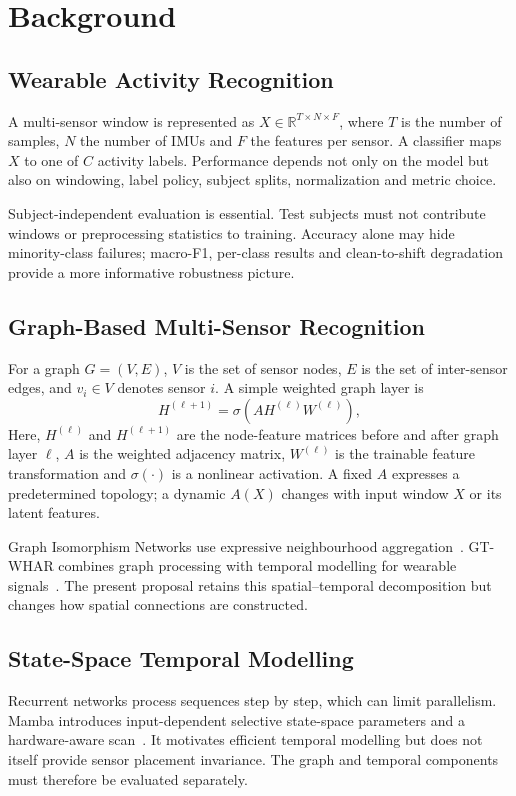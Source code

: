 \documentclass[12pt,a4paper,twoside,openright]{report}
\begin{document}
\section{Background}

\subsection{Wearable Activity Recognition}
A multi-sensor window is represented as $X\in\mathbb{R}^{T\times N\times F}$, where $T$ is the number of samples, $N$ the number of IMUs and $F$ the features per sensor. A classifier maps $X$ to one of $C$ activity labels. Performance depends not only on the model but also on windowing, label policy, subject splits, normalization and metric choice.

Subject-independent evaluation is essential. Test subjects must not contribute windows or preprocessing statistics to training. Accuracy alone may hide minority-class failures; macro-F1, per-class results and clean-to-shift degradation provide a more informative robustness picture.

\subsection{Graph-Based Multi-Sensor Recognition}
For a graph $G=(V,E)$, $V$ is the set of sensor nodes, $E$ is the set of inter-sensor edges, and $v_i\in V$ denotes sensor $i$. A simple weighted graph layer is
\[
H^{(\ell+1)}=\sigma\!\left(AH^{(\ell)}W^{(\ell)}\right),
\]
Here, $H^{(\ell)}$ and $H^{(\ell+1)}$ are the node-feature matrices before and after graph layer $\ell$, $A$ is the weighted adjacency matrix, $W^{(\ell)}$ is the trainable feature transformation and $\sigma(\cdot)$ is a nonlinear activation. A fixed $A$ expresses a predetermined topology; a dynamic $A(X)$ changes with input window $X$ or its latent features.

Graph Isomorphism Networks use expressive neighbourhood aggregation~\cite{gin}. GT-WHAR combines graph processing with temporal modelling for wearable signals~\cite{gtwhar}. The present proposal retains this spatial--temporal decomposition but changes how spatial connections are constructed.

\subsection{State-Space Temporal Modelling}
Recurrent networks process sequences step by step, which can limit parallelism. Mamba introduces input-dependent selective state-space parameters and a hardware-aware scan~\cite{mamba}. It motivates efficient temporal modelling but does not itself provide sensor placement invariance. The graph and temporal components must therefore be evaluated separately.
\end{document}
